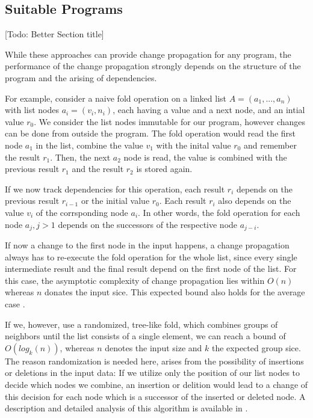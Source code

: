 \subsection{Suitable Programs} [Todo: Better Section title]

While these approaches can provide change propagation for any program, the performance of the change propagation strongly depends on the structure of the program and the arising of dependencies. 

For example, consider a naive fold operation on a linked list $A = (a_1, ..., a_n)$ with list nodes $a_i = (v_i, n_i)$, each having a value and a next node, and an intial value $r_0$. We consider the list nodes immutable for our program, however changes can be done from outside the program. The fold operation would read the first node $a_1$ in the list, combine the value $v_1$ with the inital value $r_0$ and remember the result $r_1$. Then, the next $a_2$ node is read, the value is combined with the previous result $r_1$ and the result $r_2$ is stored again. 

If we now track dependencies for this operation, each result $r_i$ depends on the previous result $r_{i - 1}$ or the initial value $r_0$. Each result $r_i$ also depends on the value $v_i$ of the corrsponding node $a_i$. In other words, the fold operation for each node $a_j, j > 1$ depends on the successors of the respective node $a_{j - i}$.

If now a change to the first node in the input happens, a change propagation always has to re-execute the fold operation for the whole list, since every single intermediate result and the final result depend on the first node of the list. For this case, the asymptotic complexity of change propagation lies within $O(n)$ whereas $n$ donates the input sice. This expected bound also holds for the average case \cite{Acar2005thesis}.

If we, however, use a randomized, tree-like fold, which combines groups of neighbors until the list consists of a single element, we can reach a bound of $O(log_k(n))$, whereas $n$ denotes the input size and $k$ the expected group sice. 
The reason randomization is needed here, arises from the possibility of insertions or deletions in the input data: If we utilize only the position of our list nodes to decide which nodes we combine, an insertion or delition would lead to a change of this decision for each node which is a successor of the inserted or deleted node. A description and detailed analysis of this algorithm is available in \cite{Acar2005thesis}. 


